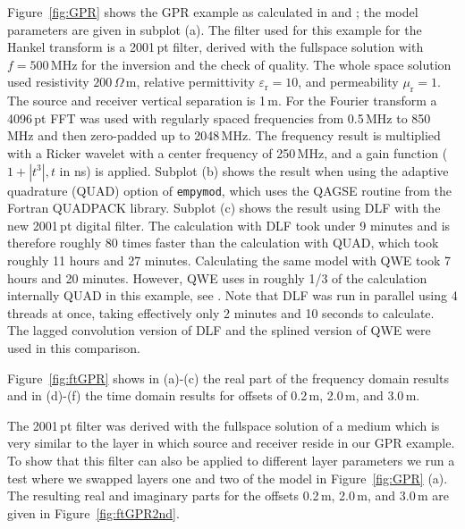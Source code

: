 \documentclass[paper,twocolumn,twoside]{geophysics}
\newcommand{\mr}[1]{\mathrm{#1}}
\begin{document}
Figure~\ref{fig:GPR} shows the GPR example as calculated in
\cite{GEO.15.Hunziker} and \cite{GEO.17.Werthmuller}; the model parameters are
given in subplot (a). The filter used for this example for the Hankel transform
is a 2001\,pt filter, derived with the fullspace solution with $f=500\,$MHz for
the inversion and the check of quality. The whole space solution used
resistivity $200\,\Omega\,$m, relative permittivity $\varepsilon_\mr{r}=10$,
and permeability $\mu_\mr{r}=1$. The source and receiver vertical separation is
1\,m. For the Fourier transform a 4096\,pt FFT was used with regularly spaced
frequencies from 0.5\,MHz to 850\,MHz and then zero-padded up to 2048\,MHz. The
frequency result is multiplied with a Ricker wavelet with a center frequency of
250\,MHz, and a gain function ($1 + |t^3|, t$ in ns) is applied. Subplot (b)
shows the result when using the adaptive quadrature (QUAD) option of
\texttt{empymod}, which uses the QAGSE routine from the Fortran QUADPACK
library. Subplot (c) shows the result using DLF with the new 2001\,pt digital
filter. The calculation with DLF took under 9 minutes and is therefore roughly
80 times faster than the calculation with QUAD, which took roughly 11 hours and
27 minutes. Calculating the same model with QWE took 7 hours and 20 minutes.
However, QWE uses in roughly 1/3 of the calculation internally QUAD in this
example, see \cite{GEO.17.Werthmuller}. Note that DLF was run in parallel using
4 threads at once, taking effectively only 2 minutes and 10 seconds to
calculate.
The lagged convolution version of DLF and the splined version of QWE were used
in this comparison.
%
%

Figure~\ref{fig:ftGPR} shows in (a)-(c) the real part of the frequency domain
results and in (d)-(f) the time domain results for offsets of 0.2\,m, 2.0\,m,
and 3.0\,m.
%
%

The 2001\,pt filter was derived with the fullspace solution of a medium which
is very similar to the layer in which source and receiver reside in our GPR
example. To show that this filter can also be applied to different layer
parameters we run a test where we swapped layers one and two of the model in
Figure~\ref{fig:GPR} (a). The resulting real and imaginary parts for the
offsets 0.2\,m, 2.0\,m, and 3.0\,m are given in Figure~\ref{fig:ftGPR2nd}.
%
%
\end{document}
